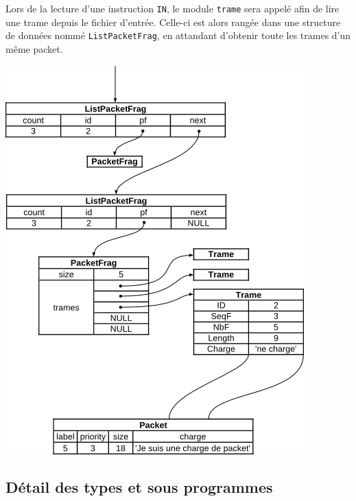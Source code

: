 \documentclass[a4paper,11pt]{article}
\begin{document}
Lors de la lecture d'une instruction \texttt{IN}, le module \texttt{trame} sera appelé afin de lire une trame depuis le fichier d'entrée. Celle-ci est alors rangée dans une structure de données nommé \texttt{ListPacketFrag}, en attandant d'obtenir toute les trames d'un même packet.

\includegraphics{s1.png}

\subsection{Détail des types et sous programmes}
\end{document}
